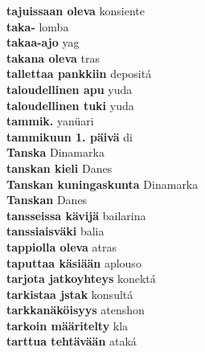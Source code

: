 \textbf{ tajuissaan oleva  } konsiente \\
\textbf{ taka-  } lomba \\
\textbf{ takaa-ajo  } yag \\
\textbf{ takana oleva  } tras \\
\textbf{ tallettaa pankkiin  } depositá \\
\textbf{ taloudellinen apu  } yuda \\
\textbf{ taloudellinen tuki  } yuda \\
\textbf{ tammik.  } yanüari \\
\textbf{ tammikuun  1. päivä  } di \\
\textbf{ Tanska  } Dinamarka \\
\textbf{ tanskan kieli  } Danes \\
\textbf{ Tanskan kuningaskunta  } Dinamarka \\
\textbf{ Tanskan  } Danes \\
\textbf{ tansseissa kävijä  } bailarina \\
\textbf{ tanssiaisväki  } balia \\
\textbf{ tappiolla oleva  } atras \\
\textbf{ taputtaa käsiään  } aplouso \\
\textbf{ tarjota jatkoyhteys  } konektá \\
\textbf{ tarkistaa jstak  } konsultá \\
\textbf{ tarkkanäköisyys  } atenshon \\
\textbf{ tarkoin määritelty  } kla \\
\textbf{ tarttua tehtävään  } ataká \\
